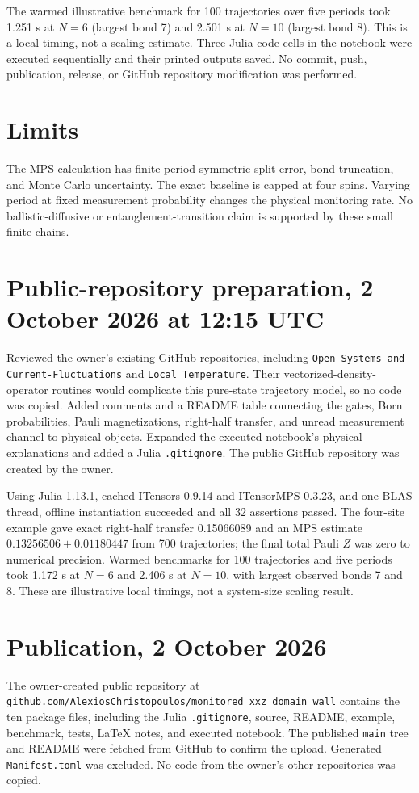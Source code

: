 \documentclass[11pt]{article}
\begin{document}
The warmed illustrative benchmark for 100 trajectories over five periods
took 1.251 s at $N=6$ (largest bond 7) and 2.501 s at $N=10$
(largest bond 8). This is a local timing, not a scaling estimate. Three
Julia code cells in the notebook were executed sequentially and their
printed outputs saved. No commit, push, publication, release, or GitHub
repository modification was performed.
\section*{Limits}
The MPS calculation has finite-period symmetric-split error, bond
truncation, and Monte Carlo uncertainty. The exact baseline is capped at
four spins. Varying period at fixed measurement probability changes the
physical monitoring rate. No ballistic-diffusive or entanglement-transition
claim is supported by these small finite chains.
\section*{Public-repository preparation, 2 October 2026 at 12:15 UTC}
Reviewed the owner's existing GitHub repositories, including
\texttt{Open-Systems-and-Current-Fluctuations} and
\texttt{Local\_Temperature}. Their vectorized-density-operator routines
would complicate this pure-state trajectory model, so no code was copied.
Added comments and a README table connecting the gates, Born probabilities,
Pauli magnetizations, right-half transfer, and unread measurement channel
to physical objects. Expanded the executed notebook's physical explanations
and added a Julia \texttt{.gitignore}. The public GitHub repository was
created by the owner.

Using Julia 1.13.1, cached ITensors 0.9.14 and ITensorMPS 0.3.23, and one
BLAS thread, offline instantiation succeeded and all 32 assertions passed.
The four-site example gave exact right-half transfer 0.15066089 and an
MPS estimate $0.13256506\pm0.01180447$ from 700 trajectories; the final
total Pauli $Z$ was zero to numerical precision. Warmed benchmarks for
100 trajectories and five periods took 1.172 s at $N=6$ and 2.406 s
at $N=10$, with largest observed bonds 7 and 8. These are illustrative
local timings, not a system-size scaling result.
\section*{Publication, 2 October 2026}
The owner-created public repository at
\texttt{github.com/AlexiosChristopoulos/monitored\_xxz\_domain\_wall}
contains the ten package files, including the Julia \texttt{.gitignore},
source, README, example, benchmark, tests, LaTeX notes, and executed
notebook. The published \texttt{main} tree and README were fetched from
GitHub to confirm the upload. Generated \texttt{Manifest.toml} was
excluded. No code from the owner's other repositories was copied.
\end{document}

